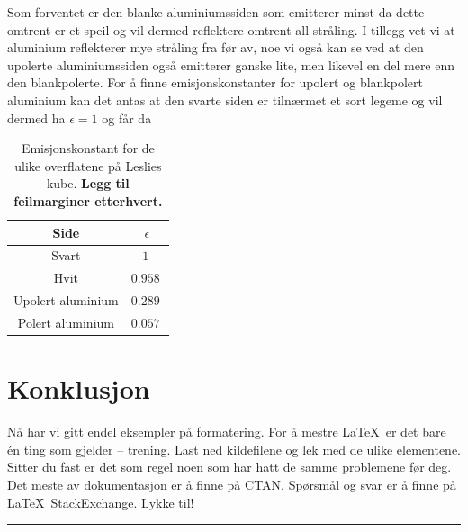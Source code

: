 Som forventet er den blanke aluminiumssiden som emitterer minst da dette omtrent er et speil og vil dermed reflektere omtrent all stråling. I tillegg vet vi at aluminium reflekterer mye stråling fra før av, noe vi også kan se ved at den upolerte aluminiumssiden også emitterer ganske lite, men likevel en del mere enn den blankpolerte. For å finne emisjonskonstanter for upolert og blankpolert aluminium kan det antas at den svarte siden er tilnærmet et sort legeme og vil dermed ha $\epsilon = 1$ og får da

\begin{table}
  \centering
  \caption{Emisjonskonstant for de ulike overflatene på Leslies kube. \textbf{Legg til feilmarginer etterhvert.}}
  \begin{tabular}{cc}
    \toprule
    Side & $\epsilon$ \\
    \midrule
    Svart & $\SI{1}{}$ \\
    Hvit & $\SI{0.958}{}$ \\
    Upolert aluminium & $\SI{0.289}{}$ \\
    Polert aluminium & $\SI{0.057}{}$ \\
    \bottomrule
  \end{tabular}
  \label{tab:LeslieEmisjonsevne}
\end{table}


\section{Konklusjon}
Nå har vi gitt endel eksempler på formatering. For å mestre \LaTeX\ er det bare én ting som gjelder -- trening. Last ned kildefilene og lek med de ulike elementene. Sitter du fast er det som regel noen som har hatt de samme problemene før deg. Det meste av dokumentasjon er å finne på \href{http://www.ctan.org/}{CTAN}. Spørsmål og svar er å finne på \href{http://tex.stackexchange.com/}{\LaTeX\ StackExchange}. Lykke til!

\begingroup
\begin{center}
\rule{2cm}{.4pt} %
\end{center}
\makeatletter
{} %
\makeatother


\endgroup


